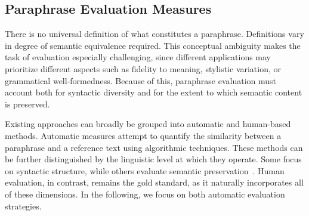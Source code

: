 
\subsection{Paraphrase Evaluation Measures}
\label{subsec:paraphrase_evaluation}

There is no universal definition of what constitutes a paraphrase. 
Definitions vary in degree of semantic equivalence required. 
This conceptual ambiguity makes the task of evaluation especially challenging, since different applications may prioritize different aspects such as fidelity to meaning, stylistic variation, or grammatical well-formedness.
Because of this, paraphrase evaluation must account both for syntactic diversity and for the extent to which semantic content is preserved. 

Existing approaches can broadly be grouped into automatic and human-based methods. 
Automatic measures attempt to quantify the similarity between a paraphrase and a reference text using algorithmic techniques. 
These methods can be further distinguished by the linguistic level at which they operate. 
Some focus on syntactic structure, while others evaluate semantic preservation~\citep{gohsen_captions_2023}. 
Human evaluation, in contrast, remains the gold standard, as it naturally incorporates all of these dimensions.
In the following, we focus on both automatic evaluation strategies. 





